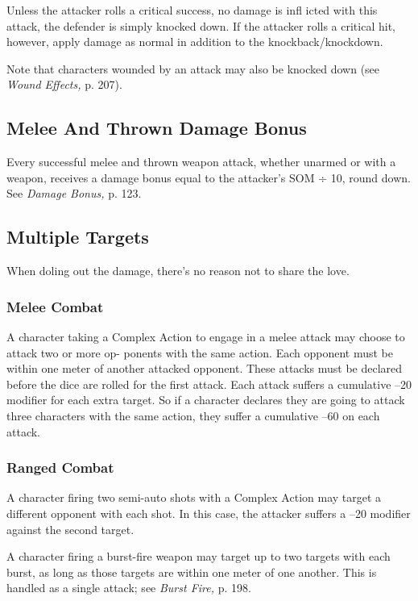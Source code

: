 Unless the attacker rolls a critical success, no 
damage is infl icted with this attack, the defender is 
simply knocked down. If the attacker rolls a critical 
hit, however, apply damage as normal in addition to 
the knockback/knockdown.

Note that characters wounded by an attack may 
also be knocked down (see \textit{Wound Effects,} p. 207).

\subsection{Melee And Thrown Damage Bonus}

Every successful melee and thrown weapon attack, 
whether unarmed or with a weapon, receives a damage 
bonus equal to the attacker's SOM ÷ 10, round down. 
See \textit{Damage Bonus,} p. 123.

\subsection{Multiple Targets}

When doling out the damage, there's no reason not to 
share the love.

\subsubsection{Melee Combat}

A character taking a Complex Action to engage in a 
melee attack may choose to attack two or more op-
ponents with the same action. Each opponent must be 
within one meter of another attacked opponent. These 
attacks must be declared before the dice are rolled for 
the first attack. Each attack suffers a cumulative –20 
modifier for each extra target. So if a character declares 
they are going to attack three characters with the same 
action, they suffer a cumulative –60 on each attack.

\subsubsection{Ranged Combat}

A character firing two semi-auto shots with a Complex 
Action may target a different opponent with each shot. 
In this case, the attacker suffers a –20 modifier against 
the second target.

A character firing a burst-fire weapon may target up 
to two targets with each burst, as long as those targets 
are within one meter of one another. This is handled 
as a single attack; see \textit{Burst Fire,} p. 198.

